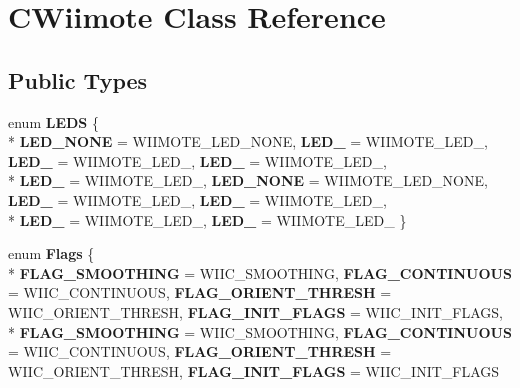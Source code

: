 \hypertarget{class_c_wiimote}{\section{C\-Wiimote Class Reference}
\label{class_c_wiimote}
}
\subsection*{Public Types}
\begin{DoxyCompactItemize}
\item 
enum {\bfseries L\-E\-D\-S} \{ \\*
{\bfseries L\-E\-D\-\_\-\-N\-O\-N\-E} =  W\-I\-I\-M\-O\-T\-E\-\_\-\-L\-E\-D\-\_\-\-N\-O\-N\-E, 
{\bfseries L\-E\-D\-\_} =  W\-I\-I\-M\-O\-T\-E\-\_\-\-L\-E\-D\-\_, 
{\bfseries L\-E\-D\-\_} =  W\-I\-I\-M\-O\-T\-E\-\_\-\-L\-E\-D\-\_, 
{\bfseries L\-E\-D\-\_} =  W\-I\-I\-M\-O\-T\-E\-\_\-\-L\-E\-D\-\_, 
\\*
{\bfseries L\-E\-D\-\_} =  W\-I\-I\-M\-O\-T\-E\-\_\-\-L\-E\-D\-\_, 
{\bfseries L\-E\-D\-\_\-\-N\-O\-N\-E} =  W\-I\-I\-M\-O\-T\-E\-\_\-\-L\-E\-D\-\_\-\-N\-O\-N\-E, 
{\bfseries L\-E\-D\-\_} =  W\-I\-I\-M\-O\-T\-E\-\_\-\-L\-E\-D\-\_, 
{\bfseries L\-E\-D\-\_} =  W\-I\-I\-M\-O\-T\-E\-\_\-\-L\-E\-D\-\_, 
\\*
{\bfseries L\-E\-D\-\_} =  W\-I\-I\-M\-O\-T\-E\-\_\-\-L\-E\-D\-\_, 
{\bfseries L\-E\-D\-\_} =  W\-I\-I\-M\-O\-T\-E\-\_\-\-L\-E\-D\-\_
 \}
\item 
enum {\bfseries Flags} \{ \\*
{\bfseries F\-L\-A\-G\-\_\-\-S\-M\-O\-O\-T\-H\-I\-N\-G} =  W\-I\-I\-C\-\_\-\-S\-M\-O\-O\-T\-H\-I\-N\-G, 
{\bfseries F\-L\-A\-G\-\_\-\-C\-O\-N\-T\-I\-N\-U\-O\-U\-S} =  W\-I\-I\-C\-\_\-\-C\-O\-N\-T\-I\-N\-U\-O\-U\-S, 
{\bfseries F\-L\-A\-G\-\_\-\-O\-R\-I\-E\-N\-T\-\_\-\-T\-H\-R\-E\-S\-H} =  W\-I\-I\-C\-\_\-\-O\-R\-I\-E\-N\-T\-\_\-\-T\-H\-R\-E\-S\-H, 
{\bfseries F\-L\-A\-G\-\_\-\-I\-N\-I\-T\-\_\-\-F\-L\-A\-G\-S} =  W\-I\-I\-C\-\_\-\-I\-N\-I\-T\-\_\-\-F\-L\-A\-G\-S, 
\\*
{\bfseries F\-L\-A\-G\-\_\-\-S\-M\-O\-O\-T\-H\-I\-N\-G} =  W\-I\-I\-C\-\_\-\-S\-M\-O\-O\-T\-H\-I\-N\-G, 
{\bfseries F\-L\-A\-G\-\_\-\-C\-O\-N\-T\-I\-N\-U\-O\-U\-S} =  W\-I\-I\-C\-\_\-\-C\-O\-N\-T\-I\-N\-U\-O\-U\-S, 
{\bfseries F\-L\-A\-G\-\_\-\-O\-R\-I\-E\-N\-T\-\_\-\-T\-H\-R\-E\-S\-H} =  W\-I\-I\-C\-\_\-\-O\-R\-I\-E\-N\-T\-\_\-\-T\-H\-R\-E\-S\-H, 
{\bfseries F\-L\-A\-G\-\_\-\-I\-N\-I\-T\-\_\-\-F\-L\-A\-G\-S} =  W\-I\-I\-C\-\_\-\-I\-N\-I\-T\-\_\-\-F\-L\-A\-G\-S

\end{DoxyCompactItemize}
